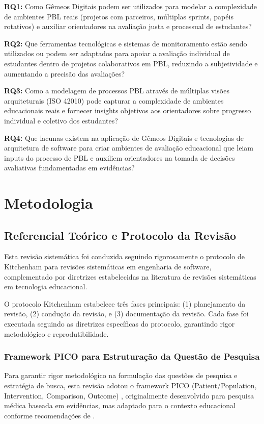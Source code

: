 \documentclass[english, spanish, brazilian]{RBIEarticle} %
\begin{document}
\textbf{RQ1:} Como Gêmeos Digitais podem ser utilizados para modelar a complexidade de ambientes PBL reais (projetos com parceiros, múltiplas sprints, papéis rotativos) e auxiliar orientadores na avaliação justa e processual de estudantes?

\textbf{RQ2:} Que ferramentas tecnológicas e sistemas de monitoramento estão sendo utilizados ou podem ser adaptados para apoiar a avaliação individual de estudantes dentro de projetos colaborativos em PBL, reduzindo a subjetividade e aumentando a precisão das avaliações?

\textbf{RQ3:} Como a modelagem de processos PBL através de múltiplas visões arquiteturais (ISO 42010) pode capturar a complexidade de ambientes educacionais reais e fornecer insights objetivos aos orientadores sobre progresso individual e coletivo dos estudantes?

\textbf{RQ4:} Que lacunas existem na aplicação de Gêmeos Digitais e tecnologias de arquitetura de software para criar ambientes de avaliação educacional que leiam inputs do processo de PBL e auxiliem orientadores na tomada de decisões avaliativas fundamentadas em evidências?

\section{Metodologia}

\subsection{Referencial Teórico e Protocolo da Revisão}

Esta revisão sistemática foi conduzida seguindo rigorosamente o protocolo de Kitchenham \parencite{Kitchenham2007} para revisões sistemáticas em engenharia de software, complementado por diretrizes estabelecidas na literatura de revisões sistemáticas em tecnologia educacional.

O protocolo Kitchenham estabelece três fases principais: (1) planejamento da revisão, (2) condução da revisão, e (3) documentação da revisão. Cada fase foi executada seguindo as diretrizes específicas do protocolo, garantindo rigor metodológico e reprodutibilidade.

\subsubsection{Framework PICO para Estruturação da Questão de Pesquisa}

Para garantir rigor metodológico na formulação das questões de pesquisa e estratégia de busca, esta revisão adotou o framework PICO (Patient/Population, Intervention, Comparison, Outcome) \parencite{Richardson1995}, originalmente desenvolvido para pesquisa médica baseada em evidências, mas adaptado para o contexto educacional conforme recomendações de \textcite{Davies2011}.
\end{document}
